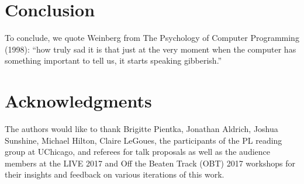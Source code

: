 \newcommand{\discussionSection}{Conclusion}
\section{\protect\discussionSection} %
\label{sec:discussion}
To conclude, we quote Weinberg from The Psychology of Computer Programming (1998): ``how truly sad it is that just at the very moment
when the computer has something important to tell us, it starts
speaking gibberish.''

\newcommand{\acksSection}{Acknowledgments}
\section*{\protect\acksSection} 
\label{sec:acks}

The authors would like to thank Brigitte Pientka, Jonathan Aldrich, Joshua Sunshine, Michael Hilton, Claire LeGoues, the participants of the PL reading group at UChicago, and referees for talk proposals as well as the audience members at the LIVE 2017 and Off the Beaten Track (OBT) 2017 workshops for their insights and feedback on various iterations of this work. 









